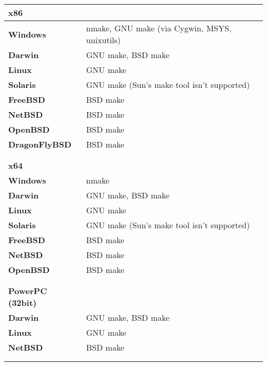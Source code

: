 \begin{tabular}{l l}
{\bf{\large x86}}   &                                               \\
\hline\hline
{\bf Windows}       & nmake, GNU make (via Cygwin, MSYS, unixutils) \\
{\bf Darwin}        & GNU make, BSD make                            \\
{\bf Linux}         & GNU make                                      \\
{\bf Solaris}       & GNU make (Sun's make tool isn't supported)    \\
{\bf FreeBSD}       & BSD make                                      \\
{\bf NetBSD}        & BSD make                                      \\
{\bf OpenBSD}       & BSD make                                      \\
{\bf DragonFlyBSD}  & BSD make                                      \\
\hline
                    &                                               \\
                    &                                               \\


{\bf{\large x64}}   &                                               \\
\hline\hline
{\bf Windows}       & nmake                                         \\
{\bf Darwin}        & GNU make, BSD make                            \\
{\bf Linux}         & GNU make                                      \\
{\bf Solaris}       & GNU make (Sun's make tool isn't supported)    \\
{\bf FreeBSD}       & BSD make                                      \\
{\bf NetBSD}        & BSD make                                      \\
{\bf OpenBSD}       & BSD make                                      \\
\hline
                    &                                               \\
                    &                                               \\


{\bf{\large PowerPC (32bit)}} &                                     \\
\hline\hline
{\bf Darwin}        & GNU make, BSD make                            \\
{\bf Linux}         & GNU make                                      \\
{\bf NetBSD}        & BSD make                                      \\
\hline
                    &                                               \\
                    &                                               \\



\end{tabular}
